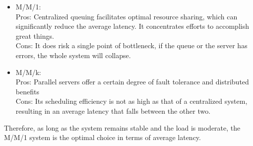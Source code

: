 \begin{homeworkProblem}
\begin{itemize}
\item M/M/1: \\
Pros: Centralized queuing facilitates optimal resource sharing, which can significantly reduce the average latency. It concentrates efforts to accomplish great things. \\
Cons: It does risk a single point of bottleneck, if the queue or the server has errors, the whole system will collapse.

\item M/M/k: \\
Pros: Parallel servers offer a certain degree of fault tolerance and distributed benefits \\
Cons: Its scheduling efficiency is not as high as that of a centralized system, resulting in an average latency that falls between the other two.
\end{itemize}

Therefore, as long as the system remains stable and the load is moderate, the M/M/1 system is the optimal choice in terms of average latency.



\end{homeworkProblem}

